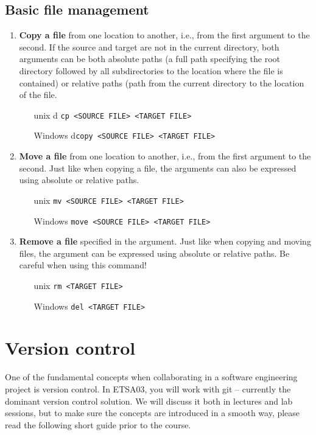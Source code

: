 \documentclass{scrreprt}
\begin{document}
\section{Basic file management}
\begin{enumerate}
\item \textbf{Copy a file} from one location to another, i.e., from the first argument to the second. If the source and target are not in the current directory, both arguments can be both absolute paths (a full path specifying  the root directory followed by all subdirectories to the location where the file is contained) or relative paths (path from the current directory to the location of the file.
\begin{itemize}
\item[unix]d \texttt{cp <SOURCE FILE> <TARGET FILE>}
\item[Windows] d\texttt{copy <SOURCE FILE> <TARGET FILE>}
\end{itemize}
\item \textbf{Move a file} from one location to another, i.e., from the first argument to the second. Just like when copying a file, the arguments can also be expressed using absolute or relative paths.
\begin{itemize}
\item[unix] \texttt{mv <SOURCE FILE> <TARGET FILE>}
\item[Windows] \texttt{move <SOURCE FILE> <TARGET FILE>}
\end{itemize}
\item \textbf{Remove a file} specified in the argument. Just like when copying and moving files, the argument can be expressed using absolute or relative paths. Be careful when using this command!
\begin{itemize}
\item[unix] \texttt{rm <TARGET FILE>}
\item[Windows] \texttt{del <TARGET FILE>}
\end{itemize}
\end{enumerate}

\chapter{Version control}
One of the fundamental concepts when collaborating in a software engineering project is version control. In ETSA03, you will work with git -- currently the dominant version control solution. We will discuss it both in lectures and lab sessions, but to make sure the concepts are introduced in a smooth way, please read the following short guide prior to the course.\\
\end{document}
